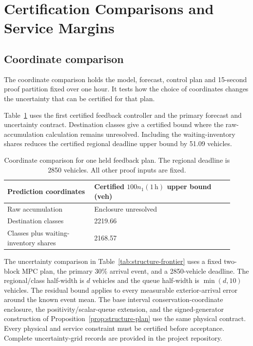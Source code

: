 \documentclass[preprint,12pt]{elsarticle}
\begin{document}
\FloatBarrier

\section{Certification Comparisons and Service Margins}
\label{sec:supp-structure}
\label{app:structure-online-details}
\subsection{Coordinate comparison}

The coordinate comparison holds the model, forecast, control plan and
15-second proof partition fixed over one hour. It tests how the choice of
coordinates changes the uncertainty that can be certified for that plan.

Table~\ref{tab:new-coordinate-ablation} uses the first certified feedback
controller and the primary forecast and uncertainty contract. Destination
classes give a certified bound where the raw-accumulation calculation
remains unresolved. Including the waiting-inventory shares reduces the
certified regional deadline upper bound by 51.09 vehicles.

\begin{table}[t]
\centering
\caption{Coordinate comparison for one held feedback plan. The regional
deadline is 2850 vehicles. All other proof inputs are fixed.}
\label{tab:new-coordinate-ablation}
\small
\begin{tabular}{@{}p{0.35\linewidth}p{0.57\linewidth}@{}}
\toprule
Prediction coordinates & Certified $100n_1(1\,\mathrm h)$ upper bound (veh)\\
\midrule
Raw accumulation & Enclosure unresolved\\
Destination classes & 2219.66\\
Classes plus waiting-inventory shares & 2168.57\\
\bottomrule
\end{tabular}
\end{table}

The uncertainty comparison in Table~\ref{tab:structure-frontier} uses a
fixed two-block MPC plan, the primary 30\% arrival event, and a
2850-vehicle deadline. The regional/class half-width is $d$ vehicles and
the queue half-width is $\min(d,10)$ vehicles. The residual bound applies
to every measurable exterior-arrival error around the known event mean.
The base interval conservation-coordinate enclosure, the positivity/scalar-queue
extension, and the signed-generator construction of
Proposition~\ref{prop:structure-plan} use the same physical contract.
Every physical and service constraint must be certified before acceptance.
Complete uncertainty-grid records are provided in the project repository.
\end{document}
